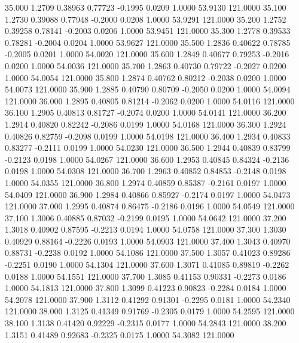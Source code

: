   35.000   1.2709   0.38963   0.77723  -0.1995   0.0209   1.0000  53.9130 121.0000
  35.100   1.2730   0.39088   0.77948  -0.2000   0.0208   1.0000  53.9291 121.0000
  35.200   1.2752   0.39258   0.78141  -0.2003   0.0206   1.0000  53.9451 121.0000
  35.300   1.2778   0.39533   0.78281  -0.2004   0.0204   1.0000  53.9627 121.0000
  35.500   1.2836   0.40622   0.78785  -0.2005   0.0201   1.0000  54.0020 121.0000
  35.600   1.2849   0.40677   0.79253  -0.2016   0.0200   1.0000  54.0036 121.0000
  35.700   1.2863   0.40730   0.79722  -0.2027   0.0200   1.0000  54.0054 121.0000
  35.800   1.2874   0.40762   0.80212  -0.2038   0.0200   1.0000  54.0073 121.0000
  35.900   1.2885   0.40790   0.80709  -0.2050   0.0200   1.0000  54.0094 121.0000
  36.000   1.2895   0.40805   0.81214  -0.2062   0.0200   1.0000  54.0116 121.0000
  36.100   1.2905   0.40813   0.81727  -0.2074   0.0200   1.0000  54.0141 121.0000
  36.200   1.2914   0.40820   0.82242  -0.2086   0.0199   1.0000  54.0168 121.0000
  36.300   1.2924   0.40826   0.82759  -0.2098   0.0199   1.0000  54.0198 121.0000
  36.400   1.2934   0.40833   0.83277  -0.2111   0.0199   1.0000  54.0230 121.0000
  36.500   1.2944   0.40839   0.83799  -0.2123   0.0198   1.0000  54.0267 121.0000
  36.600   1.2953   0.40845   0.84324  -0.2136   0.0198   1.0000  54.0308 121.0000
  36.700   1.2963   0.40852   0.84853  -0.2148   0.0198   1.0000  54.0355 121.0000
  36.800   1.2974   0.40859   0.85387  -0.2161   0.0197   1.0000  54.0409 121.0000
  36.900   1.2984   0.40866   0.85927  -0.2174   0.0197   1.0000  54.0473 121.0000
  37.000   1.2995   0.40874   0.86475  -0.2186   0.0196   1.0000  54.0549 121.0000
  37.100   1.3006   0.40885   0.87032  -0.2199   0.0195   1.0000  54.0642 121.0000
  37.200   1.3018   0.40902   0.87595  -0.2213   0.0194   1.0000  54.0758 121.0000
  37.300   1.3030   0.40929   0.88164  -0.2226   0.0193   1.0000  54.0903 121.0000
  37.400   1.3043   0.40970   0.88731  -0.2238   0.0192   1.0000  54.1086 121.0000
  37.500   1.3057   0.41023   0.89286  -0.2251   0.0190   1.0000  54.1304 121.0000
  37.600   1.3071   0.41085   0.89819  -0.2262   0.0188   1.0000  54.1551 121.0000
  37.700   1.3085   0.41153   0.90331  -0.2273   0.0186   1.0000  54.1813 121.0000
  37.800   1.3099   0.41223   0.90823  -0.2284   0.0184   1.0000  54.2078 121.0000
  37.900   1.3112   0.41292   0.91301  -0.2295   0.0181   1.0000  54.2340 121.0000
  38.000   1.3125   0.41349   0.91769  -0.2305   0.0179   1.0000  54.2595 121.0000
  38.100   1.3138   0.41420   0.92229  -0.2315   0.0177   1.0000  54.2843 121.0000
  38.200   1.3151   0.41489   0.92683  -0.2325   0.0175   1.0000  54.3082 121.0000
